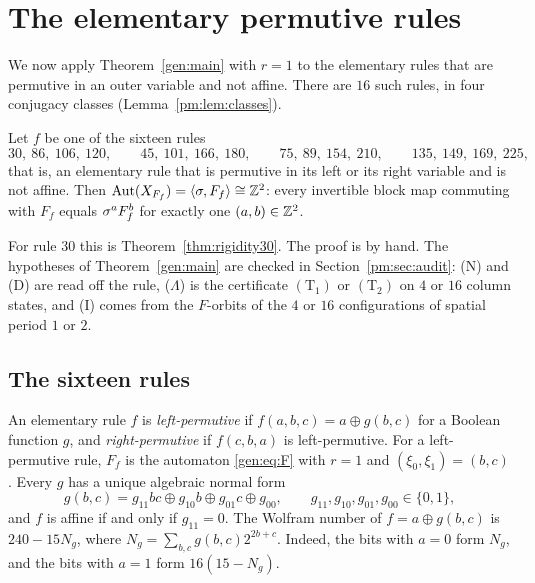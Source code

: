 \section{The elementary permutive rules}\label{sec:permutive}

We now apply Theorem~\ref{gen:main} with $r=1$ to the elementary rules that are permutive in an outer variable and not affine. There are $16$ such rules, in four conjugacy classes (Lemma~\ref{pm:lem:classes}).

\begin{theorem}\label{pm:thm:main}
Let $f$ be one of the sixteen rules
\[
30,\ 86,\ 106,\ 120,\qquad 45,\ 101,\ 166,\ 180,\qquad 75,\ 89,\ 154,\ 210,\qquad 135,\ 149,\ 169,\ 225,
\]
that is, an elementary rule that is permutive in its left or its right variable and is not affine. Then $\operatorname{Aut}(X_{F_f})=\langle\sigma,F_f\rangle\cong\mathbb{Z}^2$: every invertible block map commuting with $F_f$ equals $\sigma^aF_f^b$ for exactly one $(a,b)\in\mathbb{Z}^2$.
\end{theorem}

For rule $30$ this is Theorem~\ref{thm:rigidity30}. The proof is by hand. The hypotheses of Theorem~\ref{gen:main} are checked in Section~\ref{pm:sec:audit}: \textup{(N)} and \textup{(D)} are read off the rule, \textup{($\Lambda$)} is the certificate $(\mathrm T_1)$ or $(\mathrm T_2)$ on $4$ or $16$ column states, and \textup{(I)} comes from the $F$-orbits of the $4$ or $16$ configurations of spatial period $1$ or $2$.

\subsection{The sixteen rules}\label{pm:sec:classes}

An elementary rule $f$ is \emph{left-permutive} if $f(a,b,c)=a\oplus g(b,c)$ for a Boolean function $g$, and \emph{right-permutive} if $f(c,b,a)$ is left-permutive. For a left-permutive rule, $F_f$ is the automaton \eqref{gen:eq:F} with $r=1$ and $(\xi_0,\xi_1)=(b,c)$. Every $g$ has a unique algebraic normal form
\[
g(b,c)=g_{11}bc\oplus g_{10}b\oplus g_{01}c\oplus g_{00},\qquad g_{11},g_{10},g_{01},g_{00}\in\{0,1\},
\]
and $f$ is affine if and only if $g_{11}=0$. The Wolfram number of $f=a\oplus g(b,c)$ is $240-15N_g$, where $N_g=\sum_{b,c}g(b,c)2^{2b+c}$. Indeed, the bits with $a=0$ form $N_g$, and the bits with $a=1$ form $16(15-N_g)$.

